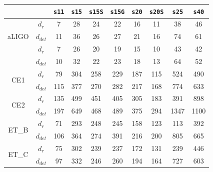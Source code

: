 \begin{table}
  \centering
  \begin{tabular}{c|c|cccccccc}

\multicolumn{2}{c|}{}  & \texttt{s11} & \texttt{s15} & \texttt{s15S} & \texttt{s15G} & \texttt{s20} & \texttt{s20S} & \texttt{s25}  & \texttt{s40}\\   

\hline
\multirow{3}{*}{aLIGO} & $d_{r}$   & 7 & 28 & 24  & 22 & 16 & 11 & 38 & 46 \\
\cline{2-10}
                       & $d_{det}$ & 11 & 36 & 26 & 27 & 21 & 16 & 74 & 61\\

\hline
\hline
\multirow{3}{*}{ADV}   & $d_{r}$   & 7  & 26  & 20 & 19 & 15 & 10 & 43 & 42 \\
\cline{2-10}
                       & $d_{det}$ &  10 & 32 & 22 & 23 & 18 & 13 & 64 & 52\\

\hline
\hline
\multirow{2}{*}{CE1}   & $d_{r}$   & 79  & 304 & 258 & 229 & 187 & 115 & 524 & 490 \\
\cline{2-10}
                       & $d_{det}$ & 115 & 377 & 270 & 282 & 217 & 168 & 774  & 633\\

\hline
\multirow{2}{*}{CE2}   & $d_{r}$  & 135 & 499 & 451 & 405 & 305 & 183 & 391 & 898 \\
\cline{2-10}
                       & $d_{det}$ & 197 & 649 & 468 & 489 & 375 & 294 & 1347  & 1100\\

\hline
\multirow{2}{*}{ET\_B} & $d_{r}$ & 71  & 293 & 248 & 245 & 158 & 123 & 113 & 392 \\
\cline{2-10}
                       & $d_{det}$ & 106 & 364 & 274 & 391 & 216 & 200 & 805 & 665\\

\hline
\multirow{2}{*}{ET\_C} & $d_{r}$ & 75  & 302 & 239 & 237 & 172 & 131 & 239 & 446 \\
\cline{2-10}
                       & $d_{det}$ & 97 & 332 & 246 & 260 & 194 & 164 & 727  & 603\\


\end{tabular}
\end{table}
